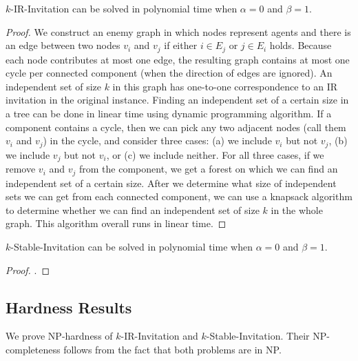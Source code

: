 \begin{theorem} \label{SIP:thm:easiness_IR_a0_b1}
	$k$-IR-Invitation can be solved in polynomial time when $\alpha =0$ and $\beta = 1$.
\end{theorem} 
\begin{proof}
	We construct an enemy graph in which nodes represent agents and there is an edge between two nodes $v_i$ and $v_j$ if either $i \in E_j$ or $j\in E_i$ holds. Because each node contributes at most one edge, the resulting graph contains at most one cycle per connected component (when the direction of edges are ignored). An independent set of size $k$ in this graph has one-to-one correspondence to an IR invitation in the original instance. Finding an independent set of a certain size in a tree can be done in linear time using dynamic programming algorithm. If a component contains a cycle, then we can pick any two adjacent nodes (call them $v_i$ and $v_j$) in the cycle, and consider three cases: (a) we include $v_i$ but not $v_j$, (b) we include $v_j$ but not $v_i$, or (c) we include neither. For all three cases, if we remove $v_i$ and $v_j$ from the component, we get a forest on which we can find an independent set of a certain size. After we determine what size of independent sets we can get from each connected component, we can use a knapsack algorithm to determine whether we can find an independent set of size $k$ in the whole graph. This algorithm overall runs in linear time.
\end{proof}

\begin{theorem} \label{SIP:thm:easiness_stable_a0_b1}
	$k$-Stable-Invitation can be solved in polynomial time when $\alpha =0$ and $\beta = 1$.
\end{theorem} 
\begin{proof} %
	.
\end{proof}




\subsection{Hardness Results}

We prove NP-hardness of $k$-IR-Invitation and $k$-Stable-Invitation. Their NP-completeness follows from the fact that both problems are in NP.

